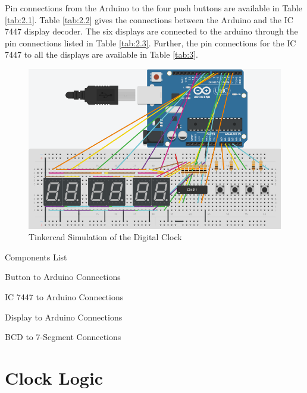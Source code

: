 \documentclass[conference]{IEEEtran}
\begin{document}
Pin connections from the Arduino to the four push buttons are available in 
Table \ref{tab:2.1}. Table \ref{tab:2.2} gives the connections between the Arduino and the IC 7447 display decoder.  The six displays are connected to the arduino through the pin connections listed in Table \ref{tab:2.3}.  Further, the pin connections for the IC 7447 to all the displays are available in Table \ref{tab:3}.
\begin{figure}[!ht]
\centering
\includegraphics[width=\columnwidth]{figs/Clock_Tinkercad.png}
\caption{Tinkercad Simulation of the Digital Clock}
\label{fig:tinker}
\end{figure}
\begin{table}[!h]
\centering

\caption{Components List}
\label{tab:component}
\end{table}
\begin{table}[!h]
\centering

\caption{Button to Arduino Connections}
\label{tab:2.1}
\end{table}
\begin{table}[!h]
\centering

\caption{IC 7447 to Arduino Connections}
\label{tab:2.2}
\end{table}
\begin{table}[!h]
\centering

\caption{Display to Arduino Connections}
\label{tab:2.3}
\end{table}
\begin{table}[!h]
\centering

\caption{BCD to 7-Segment Connections}
\label{tab:3}
\end{table}
\section{Clock Logic}
%
%











\end{document}

